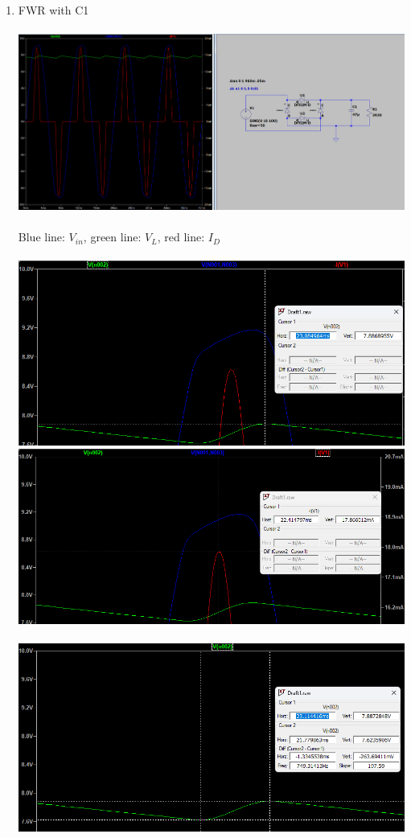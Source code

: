 \documentclass{article}
\begin{document}
\begin{enumerate}
				\item FWR with C1\\\\
				\includegraphics[scale=0.35]{prelab/problem 3 - 4}\\\\
				Blue line: \(V_{in}\), green line: \(V_L\), red line: \(I_D\)\\\\
				\includegraphics[scale=0.35]{prelab/problem 3 - 5}
				\includegraphics[scale=0.35]{prelab/problem 3 - 6}\\\\
				\includegraphics[scale=0.35]{prelab/problem 3 - 7}\\\\

\end{enumerate}
\end{document}
